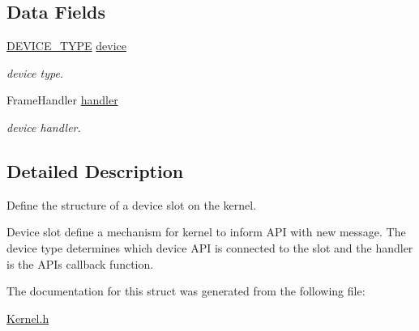 \subsection*{Data Fields}
\begin{DoxyCompactItemize}
\item 
\mbox{\label{struct_d_e_v_i_c_e___s_l_o_t_acaef663101fbc6dccf5014851d1cecd6}} 
\hyperlink{_kernel_8h_add57988c892c423bff906e04292510df}{D\+E\+V\+I\+C\+E\+\_\+\+T\+Y\+PE} \hyperlink{struct_d_e_v_i_c_e___s_l_o_t_acaef663101fbc6dccf5014851d1cecd6}{device}
\begin{DoxyCompactList}\small\item\em device type. \end{DoxyCompactList}\item 
\mbox{\label{struct_d_e_v_i_c_e___s_l_o_t_a2e75310ca6d52cb0e1d07a1000a86436}} 
Frame\+Handler \hyperlink{struct_d_e_v_i_c_e___s_l_o_t_a2e75310ca6d52cb0e1d07a1000a86436}{handler}
\begin{DoxyCompactList}\small\item\em device handler. \end{DoxyCompactList}\end{DoxyCompactItemize}


\subsection{Detailed Description}
Define the structure of a device slot on the kernel. 

Device slot define a mechanism for kernel to inform A\+PI with new message. The device type determines which device A\+PI is connected to the slot and the handler is the A\+PI\textquotesingle{}s callback function. 

The documentation for this struct was generated from the following file\+:\begin{DoxyCompactItemize}
\item 
\hyperlink{_kernel_8h}{Kernel.\+h}\end{DoxyCompactItemize}
